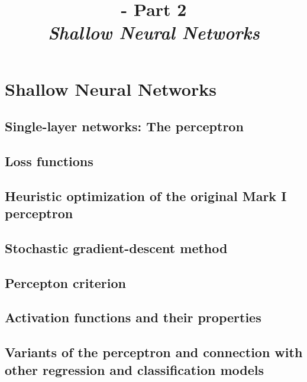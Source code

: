 \renewcommand{\prevpart}{1 }
\renewcommand{\thispart}{2 }
\renewcommand{\nextpart}{3 }

%
%

\section{Shallow Neural Networks}

\title[\modulename - Part \thispart]
{
  {\bf 
   \modulename - 
   Part \thispart\\
  }
  \vspace{0.5cm}
  {\it 
   \color{yellow}
    Shallow Neural Networks\\
  }
}



\begin{frame}[plain]
  \titlepage
\end{frame}



\subsection{Single-layer networks: The perceptron}


\subsection{Loss functions}
\subsection{Heuristic optimization of the original Mark I perceptron}
\subsection{Stochastic gradient-descent method}
\subsection{Percepton criterion}
\subsection{Activation functions and their properties}
\subsection{Variants of the perceptron and connection with other regression and classification models}
